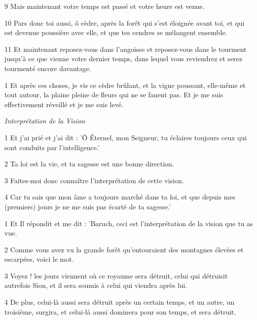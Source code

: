 \par 9 Mais maintenant votre temps est passé et votre heure est venue.

\par 10 Pars donc toi aussi, ô cèdre, après la forêt qui s'est éloignée avant toi, et qui est devenue poussière avec elle, et que tes cendres se mélangent ensemble.

\par 11 Et maintenant reposez-vous dans l'angoisse et reposez-vous dans le tourment jusqu'à ce que vienne votre dernier temps, dans lequel vous reviendrez et serez tourmenté encore davantage.


\par 1 Et après ces choses, je vis ce cèdre brûlant, et la vigne poussant, elle-même et tout autour, la plaine pleine de fleurs qui ne se fanent pas. Et je me suis effectivement réveillé et je me suis levé.


\par \textit{Interprétation de la Vision}

\par 1 Et j'ai prié et j'ai dit : 'Ô Éternel, mon Seigneur, tu éclaires toujours ceux qui sont conduits par l'intelligence.'

\par 2 Ta loi est la vie, et ta sagesse est une bonne direction.

\par 3 Faites-moi donc connaître l'interprétation de cette vision.

\par 4 Car tu sais que mon âme a toujours marché dans ta loi, et que depuis mes (premiers) jours je ne me suis pas écarté de ta sagesse.'


\par 1 Et Il répondit et me dit : 'Baruch, ceci est l'interprétation de la vision que tu as vue.

\par 2 Comme vous avez vu la grande forêt qu'entouraient des montagnes élevées et escarpées, voici le mot.

\par 3 Voyez ! les jours viennent où ce royaume sera détruit, celui qui détruisit autrefois Sion, et il sera soumis à celui qui viendra après lui.

\par 4 De plus, celui-là aussi sera détruit après un certain temps, et un autre, un troisième, surgira, et celui-là aussi dominera pour son temps, et sera détruit.

